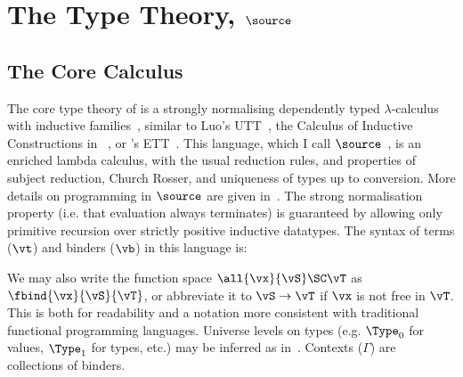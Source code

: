 \section{The Type Theory, $\source$}

\renewcommand{\Vnil}{\DC{vnil}}
\renewcommand{\Vcons}{\DC{vcons}}

\subsection{The Core Calculus}

\label{corett}

The core type theory of \Ivor{} is a strongly normalising dependently
typed $\lambda$-calculus with inductive families~\cite{dybjer94},
similar to Luo's UTT~\cite{luo94}, the Calculus of Inductive
Constructions in \Coq{}~\cite{coq-manual}, or \Epigram{}'s
ETT~\cite{epireloaded}.  This language, which I call
$\source$~\cite{brady-thesis}, is an enriched lambda calculus, with
the usual reduction rules, and properties of subject reduction, Church
Rosser, and uniqueness of types up to conversion.
More details on programming in $\source$ are given
in~\cite{brady-thesis,dt-framework}.
The strong
normalisation property (i.e. that evaluation always terminates) is
guaranteed by allowing only primitive recursion over strictly positive
inductive datatypes. The syntax of terms ($\vt$) and binders ($\vb$)
in this language is:


We may also write the function space
\mbox{$\all{\vx}{\vS}\SC\vT$} as \mbox{$\fbind{\vx}{\vS}{\vT}$}, or
abbreviate it to \mbox{$\vS\to\vT$} if $\vx$ is not free in
$\vT$. This is both for readability and a notation more consistent
with traditional functional programming languages.
Universe levels on types (e.g. $\Type_0$ for values, $\Type_1$ for
types, etc.) may be inferred as in~\cite{implicit-pollack}.
Contexts ($\Gamma$) are collections of binders.

